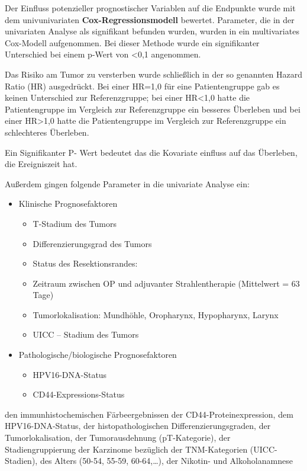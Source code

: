 Der Einfluss potenzieller prognostischer Variablen auf die Endpunkte wurde mit dem univunivariaten \textbf{Cox-Regressionsmodell} bewertet. Parameter, die in der univariaten Analyse als signifikant befunden wurden, wurden in ein multivariates Cox-Modell aufgenommen. Bei dieser Methode wurde ein signifikanter Unterschied bei einem p-Wert von \textless0,1 angenommen.

Das Risiko am Tumor zu versterben wurde schließlich in der so genannten Hazard Ratio (HR) ausgedrückt. Bei einer HR=1,0 für eine Patientengruppe gab es keinen Unterschied zur Referenzgruppe; bei einer HR\textless1,0 hatte die Patientengruppe im Vergleich zur Referenzgruppe ein besseres Überleben und bei einer HR\textgreater1,0 hatte die Patientengruppe im Vergleich zur Referenzgruppe ein schlechteres Überleben.

Ein Signifikanter P- Wert bedeutet das die Kovariate einfluss auf das Überleben, die Ereigniszeit hat.

Außerdem gingen folgende Parameter in die univariate Analyse ein:

\begin{itemize}
\tightlist
\item
  Klinische Prognosefaktoren

  \begin{itemize}
  \tightlist
  \item
    T-Stadium des Tumors
  \item
    Differenzierungsgrad des Tumors
  \item
    Status des Resektionsrandes:
  \item
    Zeitraum zwischen OP und adjuvanter Strahlentherapie (Mittelwert = 63 Tage)
  \item
    Tumorlokalisation: Mundhöhle, Oropharynx, Hypopharynx, Larynx
  \item
    UICC -- Stadium des Tumors
  \end{itemize}
\item
  Pathologische/biologische Prognosefaktoren

  \begin{itemize}
  \tightlist
  \item
    HPV16-DNA-Status
  \item
    CD44-Expressions-Status
  \end{itemize}
\end{itemize}

den immunhistochemischen Färbeergebnissen der CD44-Proteinexpression, dem HPV16-DNA-Status, der histopathologischen Differenzierungsgraden, der Tumorlokalisation, der Tumorausdehnung (pT-Kategorie), der Stadiengruppierung der Karzinome bezüglich der TNM-Kategorien (UICC-Stadien), des Alters (50-54, 55-59, 60-64,\ldots), der Nikotin- und Alkoholanamnese

